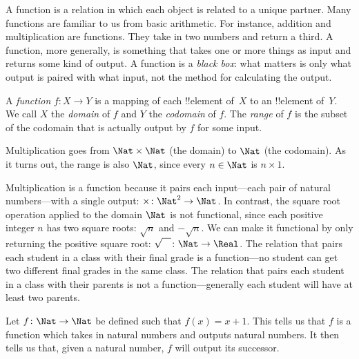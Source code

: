 \documentclass[../../include/open-logic-section]{subfiles}
\begin{document}

\begin{explain}
A function is a relation in which each object is related to a unique
partner. Many functions are familiar to us from basic arithmetic. For
instance, addition and multiplication are functions. They take in two
numbers and return a third. A function, more generally, is something
that takes one or more things as input and returns some kind of
output. A function is a \emph{black box}: what matters is only what
output is paired with what input, not the method for calculating the
output.
\end{explain}

\begin{defn}
A \emph{function} $f \colon X \to Y$ is a mapping of each !!{element}
of~$X$ to an !!{element} of~$Y$. We call $X$ the \emph{domain} of $f$
and $Y$ the \emph{codomain} of $f$. The \emph{range} of $f$ is the
subset of the codomain that is actually output by $f$ for some input.
\end{defn}

\begin{ex}
Multiplication goes from $\Nat \times \Nat$ (the domain) to $\Nat$
(the codomain). As it turns out, the range is also $\Nat$, since every
$n \in \Nat$ is $n \times 1$.
\end{ex}

\begin{explain}
Multiplication is a function because it pairs each input---each pair
of natural numbers---with a single output: $\times \colon \Nat^2 \to
\Nat$. In contrast, the square root operation applied to the domain
$\Nat$ is not functional, since each positive integer $n$ has two
square roots: $\sqrt{n}$ and $-\sqrt{n}$. We can make it functional by
only returning the positive square root: $\sqrt{\phantom{X}} \colon
\Nat \to \Real$. The relation that pairs each student in a class with
their final grade is a function---no student can get two different
final grades in the same class. The relation that pairs each student
in a class with their parents is not a function---generally each
student will have at least two parents.
\end{explain}

\begin{ex}
Let $f \colon \Nat \to \Nat$ be defined such that $f(x) = x+1$. This
tells us that $f$ is a function which takes in natural numbers and
outputs natural numbers. It then tells us that, given a natural
number, $f$ will output its successor.
\end{ex}
\end{document}
